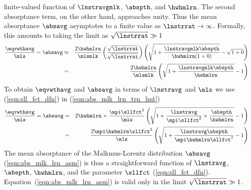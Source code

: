 \documentclass[12pt]{article}
\begin{document}
finite-valued function of $\lnstravgmlk$, $\abspth$, and $\hwhmlrn$. 
The second absorptance term, on the other hand, approaches unity.
Thus the mean absorptance $\absavg$ asymptotes to a finite value as
$\lnstrrat \rightarrow \infty$.
Formally, this amounts to taking the limit as $\sqrt{\lnstrrat} \gg 1$
\begin{eqnarray}
\frac{\eqvwthavg}{\mls} = \absavg 
& \approx & 
\frac{2 \hwhmlrn}{\mlsmlk} \left(
\frac{\sqrt{\lnstrrat}}{\sqrt{\lnstrrat}} \right)
\left( 
\sqrt{1 + \frac{\lnstravgmlk \abspth}
{\hwhmlrn (1 + 0)}} -
\sqrt{1 + 0}
\right) \nonumber \\
& = & 
\frac{2 \hwhmlrn}{\mlsmlk}
\left( \sqrt{1 + \frac{\lnstravgmlk \abspth}{\hwhmlrn}} - 1 \right) 
\label{eqn:abs_mlk_lrn_trn_lmt}
\end{eqnarray}
To obtain $\eqvwthavg$ and $\absavg$ in terms of $\lnstravg$ and
$\mls$ we use (\ref{eqn:sll_fct_dfn}) in
(\ref{eqn:abs_mlk_lrn_trn_lmt}) 
\begin{eqnarray}
\frac{\eqvwthavg}{\mls} = \absavg 
& = & 
2 \hwhmlrn \times \frac{\mpi \sllfct^{2}}{\mls}
\left( \sqrt{1 + \frac{\lnstravg}{\mpi \sllfct^{2}}
\times \frac{\abspth}{\hwhmlrn}} - 1 \right) \nonumber \\
& = & 
\frac{2 \mpi \hwhmlrn \sllfct^{2}}{\mls}
\left( \sqrt{1 + \frac{\lnstravg \abspth}{\mpi \hwhmlrn \sllfct^{2}}}
- 1 \right)
\label{eqn:abs_mlk_lrn_asm}
\end{eqnarray}
The mean absorptance of the Malkmus-Lorentz distribution $\absavg$
(\ref{eqn:abs_mlk_lrn_asm}) is thus a straightforward function of
$\lnstravg$, $\abspth$, $\hwhmlrn$, and the parameter $\sllfct$
(\ref{eqn:sll_fct_dfn}). 
Equation~(\ref{eqn:abs_mlk_lrn_asm}) is valid only in the limit
$\sqrt{\lnstrrat} \gg 1$.
\end{document}
